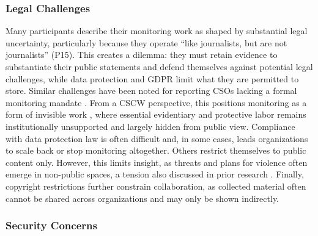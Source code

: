 \documentclass[acmsmall]{acmart}
\begin{document}
\subsubsection{Legal Challenges}
\label{sssec:legal_challenges}

Many participants describe their monitoring work as shaped by substantial legal uncertainty, particularly because they operate ``like journalists, but are not journalists'' (P15). This creates a dilemma: they must retain evidence to substantiate their public statements and defend themselves against potential legal challenges, while data protection and GDPR limit what they are permitted to store. Similar challenges have been noted for reporting CSOs lacking a formal monitoring mandate \cite{baumler_harnessing_2025}. From a CSCW perspective, this positions monitoring as a form of invisible work \cite{star_layers_1999}, where essential evidentiary and protective labor remains institutionally unsupported and largely hidden from public view.
Compliance with data protection law is often difficult and, in some cases, leads organizations to scale back or stop monitoring altogether. Others restrict themselves to public content only. However, this limits insight, as threats and plans for violence often emerge in non-public spaces, a tension also discussed in prior research \cite{conway_online_2021}.
Finally, copyright restrictions further constrain collaboration, as collected material often cannot be shared across organizations and may only be shown indirectly.

\subsubsection{Security Concerns}
\end{document}
